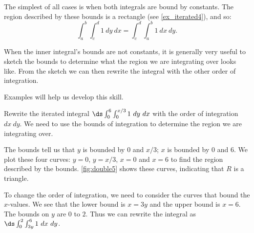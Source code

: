 The simplest of all cases is when both integrals are bound by constants. The region described by these bounds is a rectangle (see \autoref{ex_iterated4}), and so:
\[\int_a^b\int_c^d 1\ dy\ dx = \int_c^d\int_a^b1\ dx\ dy.\]

When the inner integral's bounds are not constants, it is generally very useful to sketch the bounds to determine what the region we are integrating over looks like. From the sketch we can then rewrite the integral with the other order of integration.

Examples will help us develop this skill.

\begin{example}\label{ex_double5}
Rewrite the iterated integral $\ds \int_0^6\int_0^{x/3} 1\ dy\ dx$ with the order of integration $dx\ dy$.
\solution
We need to use the bounds of integration to determine the region we are integrating over. %

The bounds tell us that $y$ is bounded by $0$ and $x/3$; $x$ is bounded by 0 and 6. We plot these four curves: $y=0$, $y=x/3$, $x=0$ and $x=6$ to find the region described by the bounds. \autoref{fig:double5} shows these curves, indicating that $R$ is a triangle.


To change the order of integration, we need to consider the curves that bound the $x$-values. We see that the lower bound is $x=3y$ and the upper bound is $x=6$. The bounds on $y$ are $0$ to $2$. Thus we can rewrite the integral as 
$\ds \int_0^2\int_{3y}^6 1\ dx \ dy$.
\end{example}

